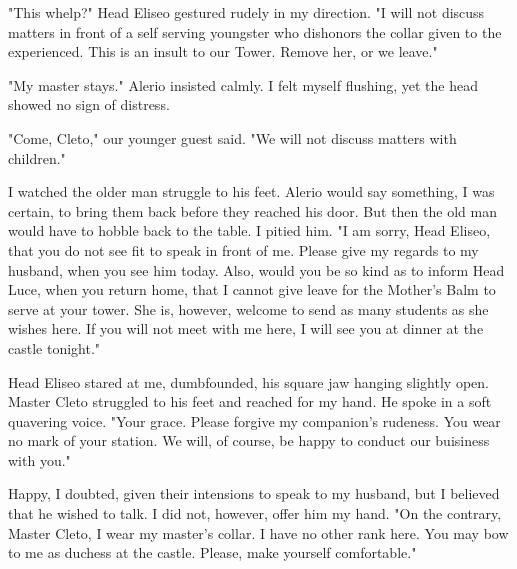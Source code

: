 \documentclass{article}
\begin{document}
"This whelp?" Head Eliseo gestured rudely in my direction. "I will not discuss matters in front of a self serving youngster who dishonors the collar given to the experienced. This is an insult to our Tower. Remove her, or we leave."

"My master stays." Alerio insisted calmly. I felt myself flushing, yet the head showed no sign of distress.

"Come, Cleto," our younger guest said. "We will not discuss matters with children."

I watched the older man struggle to his feet. Alerio would say something, I was certain, to bring them back before they reached his door. But then the old man would have to hobble back to the table. I pitied him. "I am sorry, Head Eliseo, that you do not see fit to speak in front of me. Please give my regards to my husband, when you see him today. Also, would you be so kind as to inform Head Luce, when you return home, that I cannot give leave for the Mother's Balm to serve at your tower. She is, however, welcome to send as many students as she wishes here. If you will not meet with me here, I will see you at dinner at the castle tonight."

Head Eliseo stared at me, dumbfounded, his square jaw hanging slightly open. Master Cleto struggled to his feet and reached for my hand. He spoke in a soft quavering voice. "Your grace. Please forgive my companion's rudeness. You wear no mark of your station. We will, of course, be happy to conduct our buisiness with you."

Happy, I doubted, given their intensions to speak to my husband, but I believed that he wished to talk. I did not, however, offer him my hand. "On the contrary, Master Cleto, I wear my master's collar. I have no other rank here. You may bow to me as duchess at the castle. Please, make yourself comfortable."
\end{document}
